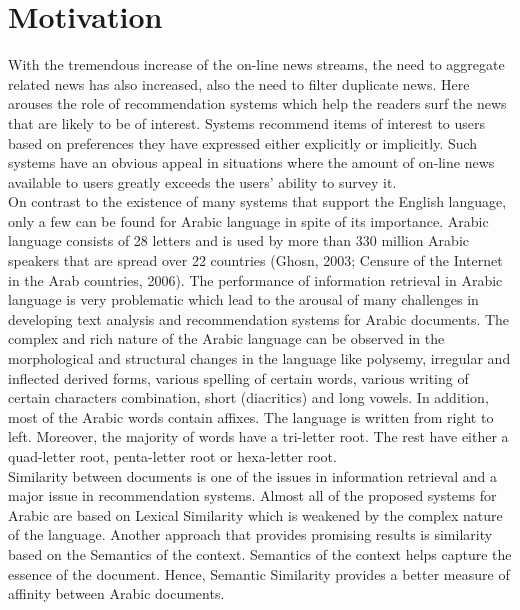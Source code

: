 \section{Motivation}\label{subsec:motivation}
With the tremendous increase of the on-line news streams, the need to aggregate related news has also increased, also the need to filter duplicate news.  Here arouses the role of recommendation systems which help the readers surf the news that are likely to be of interest. Systems recommend items of interest to users based on preferences they have expressed either explicitly or implicitly. Such systems have an obvious appeal in situations where the amount of on-line news available to users greatly exceeds the users’ ability to survey it.\\
On contrast to the existence of many systems that support the English language, only a few can be found for Arabic language in spite of its importance. Arabic language consists of 28 letters and is used by more than 330 million Arabic speakers that are spread over 22 countries (Ghosn, 2003; Censure of the Internet in the Arab countries, 2006). The performance of information retrieval in Arabic language is very problematic which lead to the arousal of many challenges in developing text analysis and recommendation systems for Arabic documents. The complex and rich nature of the Arabic language can be observed in the morphological and structural changes in the language like polysemy, irregular and inflected derived forms, various spelling of certain words, various writing of certain characters combination, short (diacritics) and long vowels. In addition, most of the Arabic words contain affixes. The language is written from right to left. Moreover, the majority of words have a tri-letter root. The rest have either a quad-letter root, penta-letter root or hexa-letter root.\\
Similarity between documents is one of the issues in information retrieval and a major issue in recommendation systems. Almost all of the proposed systems for Arabic are based on Lexical Similarity which is weakened by the complex nature of the language. Another approach that provides promising results is similarity based on the Semantics of the context. Semantics of the context helps capture the essence of the document. Hence, Semantic Similarity provides a better measure of affinity between Arabic documents.

